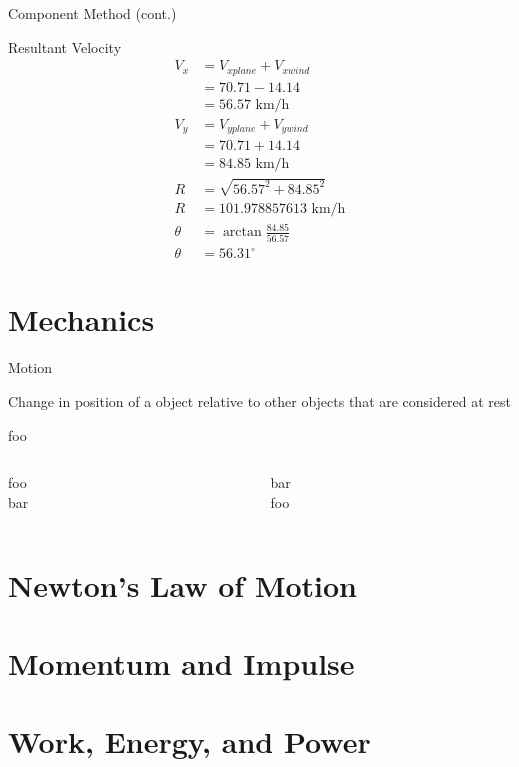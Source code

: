 \documentclass[aspectratio=169]{beamer}
\begin{document}
\begin{frame}{Component Method (cont.)}

	Resultant Velocity
	\begin{align*}
		V_x &= V_{xplane} + V_{xwind} \\
		&= 70.71 - 14.14 \\
		& = 56.57 \text{ km/h} \\
		V_y &= V_{yplane} + V_{ywind} \\
		&= 70.71 + 14.14 \\
		&= 84.85 \text{ km/h}\\
		R &= \sqrt{56.57^2 + 84.85^2} \\
		R &= 101.978857613  \text{ km/h}\\
		\theta &= \arctan{\frac{84.85}{56.57}} \\
		\theta &= 56.31^\circ
	\end{align*}
\end{frame}

\section{Mechanics}

\begin{frame}{Motion}
	\begin{definition}
		Change in position of a object relative to other objects that are considered at rest
	\end{definition}
	\begin{block}{foo}
		\begin{columns}
			\hfill
			\begin{column}{0.5\textwidth}
				foo \\ bar
			\end{column}
			\begin{column}{0.5\textwidth}
				bar \\foo
			\end{column}
		\end{columns}
	\end{block}
\end{frame}


\section{Newton's Law of Motion}

\section{Momentum and Impulse}

\section{Work, Energy, and Power}
\end{document}

